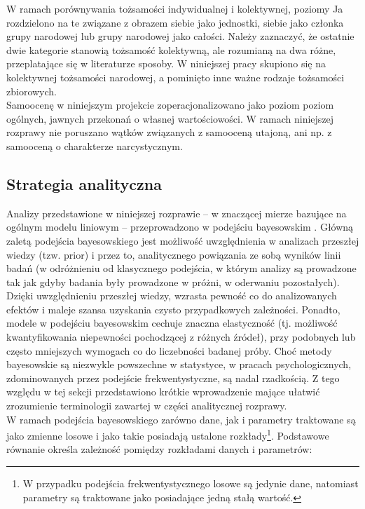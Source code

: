 \documentclass[man]{apa6}
\begin{document}
W ramach porównywania tożsamości indywidualnej i kolektywnej, poziomy Ja rozdzielono na te związane z obrazem siebie jako jednostki, siebie jako członka grupy narodowej lub grupy narodowej jako całości. Należy zaznaczyć, że ostatnie dwie kategorie stanowią tożsamość kolektywną, ale rozumianą na dwa różne, przeplatające się w literaturze sposoby. W niniejszej pracy skupiono się na kolektywnej tożsamości narodowej, a pominięto inne ważne rodzaje tożsamości zbiorowych.\\

Samoocenę w niniejszym projekcie zoperacjonalizowano jako poziom poziom ogólnych, jawnych przekonań o własnej wartościowości. W ramach niniejszej rozprawy nie poruszano wątków związanych z samooceną utajoną, ani np. z samooceną o charakterze narcystycznym.

\subsection{Strategia analityczna}
Analizy przedstawione w niniejszej rozprawie -- w znaczącej mierze bazujące na ogólnym modelu liniowym -- przeprowadzono w podejściu bayesowskim \parencite[zob. np.,][]{gelman2014bayesian,gill2014bayesian, kruschke2014doing}. Główną zaletą podejścia bayesowskiego jest możliwość uwzględnienia w analizach przeszłej wiedzy (tzw. prior) i przez to, analitycznego powiązania ze sobą wyników linii badań (w odróżnieniu od klasycznego podejścia, w którym analizy są prowadzone tak jak gdyby badania były prowadzone w próżni, w oderwaniu pozostałych). Dzięki uwzględnieniu przeszłej wiedzy, wzrasta pewność co do analizowanych efektów i maleje szansa uzyskania czysto przypadkowych zależności. Ponadto, modele w podejściu bayesowskim cechuje znaczna elastyczność (tj. możliwość kwantyfikowania niepewności pochodzącej z różnych źródeł), przy podobnych lub często mniejszych wymogach co do liczebności badanej próby. Choć metody bayesowskie są niezwykle powszechne w statystyce, w pracach psychologicznych, zdominowanych przez podejście frekwentystyczne, są nadal rzadkością. Z tego względu w tej sekcji przedstawiono krótkie wprowadzenie mające ułatwić zrozumienie terminologii zawartej w części analitycznej rozprawy.\\

W ramach podejścia bayesowskiego zarówno dane, jak i parametry traktowane są jako zmienne losowe i jako takie posiadają ustalone rozkłady\footnote{W przypadku podejścia frekwentystycznego losowe są jedynie dane, natomiast parametry są traktowane jako posiadające jedną stałą wartość.}. Podstawowe równanie określa zależność pomiędzy rozkładami danych i parametrów:
\end{document}
